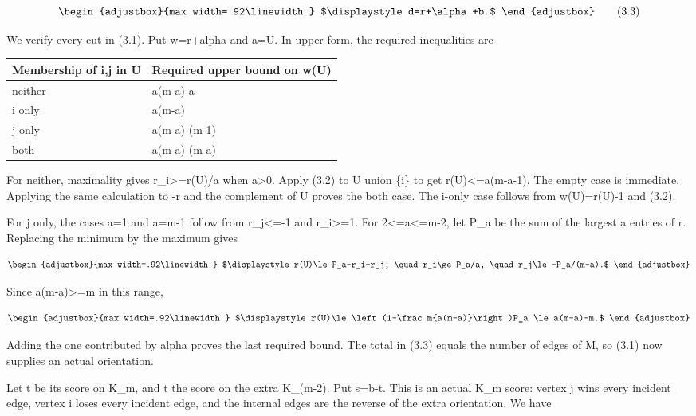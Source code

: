 \[
\begin{adjustbox}{max width=.92\linewidth}
$\displaystyle d=r+\alpha+b.$
\end{adjustbox}
\tag{3.3}
\]

We verify every cut in (3.1). Put w=r+alpha and a=\textbar U\textbar. In upper form, the required inequalities are

\begin{longtable}[]{@{}ll@{}}
\toprule\noalign{}
Membership of i,j in U & Required upper bound on w(U) \\
\midrule\noalign{}
\endhead
\bottomrule\noalign{}
\endlastfoot
neither & a(m-a)-a \\
i only & a(m-a) \\
j only & a(m-a)-(m-1) \\
both & a(m-a)-(m-a) \\
\end{longtable}

For neither, maximality gives r\_i\textgreater=r(U)/a when a\textgreater0. Apply (3.2) to U union \{i\} to get r(U)\textless=a(m-a-1). The empty case is immediate. Applying the same calculation to -r and the complement of U proves the both case. The i-only case follows from w(U)=r(U)-1 and (3.2).

For j only, the cases a=1 and a=m-1 follow from r\_j\textless=-1 and r\_i\textgreater=1. For 2\textless=a\textless=m-2, let P\_a be the sum of the largest a entries of r. Replacing the minimum by the maximum gives

\[
\begin{adjustbox}{max width=.92\linewidth}
$\displaystyle r(U)\le P_a-r_i+r_j,
\quad r_i\ge P_a/a,
\quad r_j\le-P_a/(m-a).$
\end{adjustbox}
\]

Since a(m-a)\textgreater=m in this range,

\[
\begin{adjustbox}{max width=.92\linewidth}
$\displaystyle r(U)\le\left(1-\frac m{a(m-a)}\right)P_a
\le a(m-a)-m.$
\end{adjustbox}
\]

Adding the one contributed by alpha proves the last required bound. The total in (3.3) equals the number of edges of M, so (3.1) now supplies an actual orientation.

Let t be its score on K\_m, and t\textquotesingle{} the score on the extra K\_(m-2). Put s=b-t\textquotesingle. This is an actual K\_m score: vertex j wins every incident edge, vertex i loses every incident edge, and the internal edges are the reverse of the extra orientation. We have

